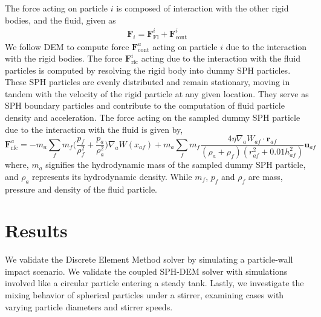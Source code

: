 \documentclass[a4paper,11pt]{book}
\newcommand{\ten}[1]{\ensuremath{\mathbf{#1}}}
\begin{document}
The force acting on particle $i$ is composed of interaction with the other rigid
bodies, and the fluid, given as
\begin{eqnarray}
  \label{eq:rfc:rb_particle_pos_update}
  \ten{F}_i = \ten{F}_{\text{Fl}}^i + \ten{F}_{\text{cont}}^i
\end{eqnarray}
We follow DEM to compute force $\ten{F}_{\text{cont}}^a$ acting on particle $i$
due to the interaction with the rigid bodies. The force $\ten{F}_{\text{rfc}}^i$
acting due to the interaction with the fluid particles is computed by resolving
the rigid body into dummy SPH particles.  These SPH particles are evenly
distributed and remain stationary, moving in tandem with the velocity of the
rigid particle at any given location.  They serve as SPH boundary particles and
contribute to the computation of fluid particle density and acceleration.  The
force acting on the sampled dummy SPH particle due to the interaction with the
fluid is given by,
\begin{equation}
  \label{eq:rfc-force}
  \ten{F}_{\text{rfc}}^a = -m_a \sum_{f} m_f \bigg(\frac{p_f}{\rho_{f}^2} +
  \frac{p_a}{\rho_{a}^2}\bigg) \nabla_{a} W(x_{af}) +
  m_a \sum_{f} m_f \frac{4 \eta \nabla_a W_{af}\cdot
    \ten{r}_{af}}{(\rho_a + \rho_f) (r_{af}^2 + 0.01 h_{af}^2)} \ten{u}_{af}
\end{equation}
where, $m_a$ signifies the hydrodynamic mass of the sampled dummy SPH particle,
and $\rho_a$ represents its hydrodynamic density. While $m_f$, $p_f$ and
$\rho_f$ are mass, pressure and density of the fluid particle.


\section{Results}

We validate the Discrete Element Method solver by simulating a particle-wall
impact scenario.  We validate the coupled SPH-DEM solver with simulations
involved like a circular particle entering a steady tank.  Lastly, we
investigate the mixing behavior of spherical particles under a stirrer,
examining cases with varying particle diameters and stirrer speeds.

\FloatBarrier%
\end{document}

